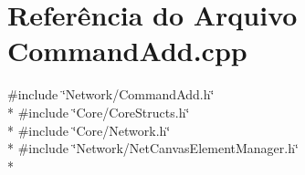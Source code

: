 \section{Referência do Arquivo Command\+Add.\+cpp}
\label{_command_add_8cpp}
{\ttfamily \#include \char`\"{}Network/\+Command\+Add.\+h\char`\"{}}\\*
{\ttfamily \#include \char`\"{}Core/\+Core\+Structs.\+h\char`\"{}}\\*
{\ttfamily \#include \char`\"{}Core/\+Network.\+h\char`\"{}}\\*
{\ttfamily \#include \char`\"{}Network/\+Net\+Canvas\+Element\+Manager.\+h\char`\"{}}\\*
